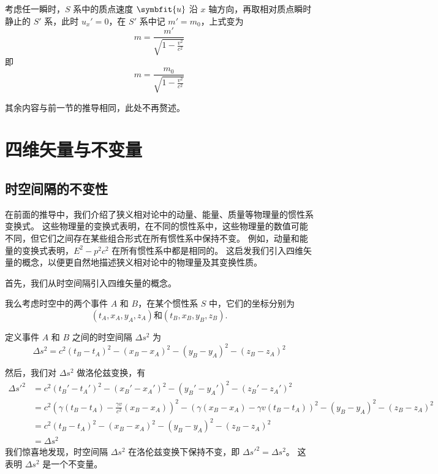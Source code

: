 考虑任一瞬时，$S$ 系中的质点速度 $\symbfit{u}$ 沿 $x$ 轴方向，再取相对质点瞬时静止的 $S'$ 系，此时 $u_x' = 0$，在 $S'$ 系中记 $m' = m_0$，上式变为
\begin{equation}
    m = \frac{m'}{\sqrt{1 - \frac{v^2}{c^2}}}
\end{equation}
即
\begin{equation}
    m = \frac{m_0}{\sqrt{1 - \frac{v^2}{c^2}}}
\end{equation}

其余内容与前一节的推导相同，此处不再赘述。

\section{四维矢量与不变量}

\subsection{时空间隔的不变性}

在前面的推导中，我们介绍了狭义相对论中的动量、能量、质量等物理量的惯性系变换式。
这些物理量的变换式表明，在不同的惯性系中，这些物理量的数值可能不同，但它们之间存在某些组合形式在所有惯性系中保持不变。
例如，动量和能量的变换式表明，$E^2 - p^2 c^2$ 在所有惯性系中都是相同的。
这启发我们引入四维矢量的概念，以便更自然地描述狭义相对论中的物理量及其变换性质。

首先，我们从时空间隔引入四维矢量的概念。

我么考虑时空中的两个事件 $A$ 和 $B$，在某个惯性系 $S$ 中，它们的坐标分别为
\begin{equation}
    (t_A, x_A, y_A, z_A) \text{和} (t_B, x_B, y_B, z_B).
\end{equation}

定义事件 $A$ 和 $B$ 之间的时空间隔 $\Delta s^2$ 为
\begin{equation}
    \Delta s^2 = c^2 (t_B - t_A)^2 - (x_B - x_A)^2 - (y_B - y_A)^2 - (z_B - z_A)^2
\end{equation}

然后，我们对 $\Delta s^2$ 做洛伦兹变换，有
\begin{equation}
    \begin{aligned}
        \Delta s'^2 & = c^2 (t_B' - t_A')^2 - (x_B' - x_A')^2 - (y_B' - y_A')^2 - (z_B' - z_A')^2                                                                                               \\
                    & = c^2 \left( \gamma (t_B - t_A) - \frac{\gamma v}{c^2} (x_B - x_A) \right)^2 - \left( \gamma (x_B - x_A) - \gamma v (t_B - t_A) \right)^2 - (y_B - y_A)^2 - (z_B - z_A)^2 \\
                    & = c^2 (t_B - t_A)^2 - (x_B - x_A)^2 - (y_B - y_A)^2 - (z_B - z_A)^2                                                                                                       \\
                    & = \Delta s^2
    \end{aligned}
\end{equation}
我们惊喜地发现，时空间隔 $\Delta s^2$ 在洛伦兹变换下保持不变，即 $\Delta s'^2 = \Delta s^2$。
这表明 $\Delta s^2$ 是一个不变量。

